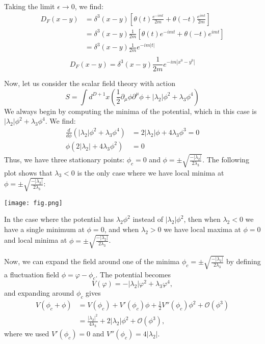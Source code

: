 \documentclass[12pt]{article}
\newcommand{\delmu}{\partial_{\mu}}
\newcommand{\delMu}{\partial^{\mu}}
\begin{document}
Taking the limit $\epsilon \to 0$, we find:
\begin{align*}
    D_F(x-y) &= \delta^3(x-y) \left[ \theta(t) \frac{e^{-imt}}{2m} +  \theta(-t)
    \frac{e^{imt}}{2m} \right] \\
    &= \delta^3(x-y) \frac{1}{2m} \left[ \theta(t) e^{-imt} +  \theta(-t) e^{imt}
    \right] \\
    &= \delta^3(x-y) \frac{1}{2m} e^{-im|t|} \\
\end{align*}
\begin{equation}
    \boxed{D_F(x-y) = \delta^3(x-y) \frac{1}{2m} e^{-im|x^0 - y^0|}}
\end{equation}

Now, let us consider the scalar field theory with action 
\begin{equation}
    S =  \int d^{D+1}x \left( \frac{1}{2}\delmu\phi\delMu\phi + |\lambda_2|\phi^2 + \lambda_3\phi^4 \right)
\end{equation}
We always begin by computing the minima of the potential, which  in this case is $|\lambda_2|\phi^2 + \lambda_3\phi^4$. We find:
\begin{align*}
    \frac{d}{d\phi} (|\lambda_2|\phi^2 + \lambda_3\phi^4) &= 2|\lambda_2|\phi + 4\lambda_3\phi^3 = 0 \\
    \phi(2|\lambda_2| + 4\lambda_3\phi^2) &= 0
\end{align*}
Thus, we have three stationary points: $\phi_c = 0$ and $\phi = \pm
\sqrt{\frac{-|\lambda_2|}{2\lambda_3}}$. The following plot shows that $\lambda_3 < 0$ is 
the only case where we have local minima at $\phi = \pm \sqrt{\frac{-|\lambda_2|}{2\lambda_3}}$:
\begin{center}
    \texttt{[image: fig.png]}
\end{center}
In the case where the potential has $\lambda_2\phi^2$ instead of
$|\lambda_2|\phi^2$, then when $\lambda_2 < 0$ we have a single minimum at $\phi = 0$,
and when $\lambda_2 > 0$ we have local maxima at $\phi = 0$ and local minima at $\phi = \pm
\sqrt{\frac{-|\lambda_2|}{2\lambda_3}}$.

Now, we can expand the field around one of the minima $\phi_c = \pm
\sqrt{\frac{-|\lambda_2|}{2\lambda_3}}$ by defining a fluctuation field
$\phi = \varphi - \phi_c$. The potential becomes
\begin{equation}
    V(\varphi) = -|\lambda_2|\varphi^2 + \lambda_3 \varphi^4,
\end{equation}
and expanding around $\phi_c$ gives
\begin{align}
    V(\phi_c + \phi)
    &= V(\phi_c) + V'(\phi_c)\phi + \frac{1}{2}V''(\phi_c)\phi^2 + \mathcal{O}(\phi^3) \\
    &= \frac{|\lambda_2|^2}{4\lambda_3} + 2|\lambda_2|\phi^2 + \mathcal{O}(\phi^3),
\end{align}
where we used $V'(\phi_c) = 0$ and $V''(\phi_c) = 4|\lambda_2|$.
\end{document}
